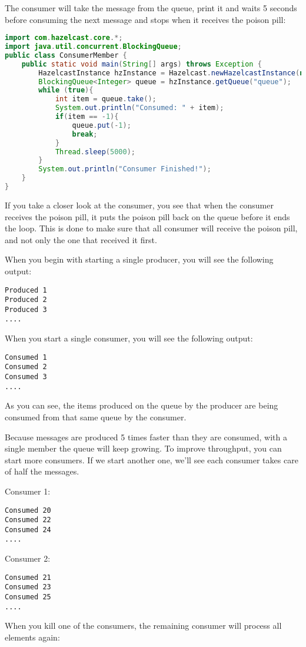 The consumer will take the message from the queue, print it and waits 5 seconds before consuming the next message and stops when it receives the poison pill:
\begin{lstlisting}[language=java]
import com.hazelcast.core.*;
import java.util.concurrent.BlockingQueue;
public class ConsumerMember {
    public static void main(String[] args) throws Exception {
        HazelcastInstance hzInstance = Hazelcast.newHazelcastInstance(null);
        BlockingQueue<Integer> queue = hzInstance.getQueue("queue");
        while (true){
            int item = queue.take();
            System.out.println("Consumed: " + item);
            if(item == -1){
                queue.put(-1);
                break;
            }     
            Thread.sleep(5000);            
        }
        System.out.println("Consumer Finished!");
    }
}
\end{lstlisting}
If you take a closer look at the consumer, you see that when the consumer receives the poison pill, it puts the poison pill back on the queue before it ends the loop. This is done to make sure that all consumer will receive the poison pill, and not only the one that received it first.

When you begin with starting a single producer, you will see the following output:
\begin{lstlisting}
Produced 1
Produced 2
Produced 3
....
\end{lstlisting}
When you start a single consumer, you will see the following output:
\begin{lstlisting}
Consumed 1
Consumed 2
Consumed 3
....
\end{lstlisting}
As you can see, the items produced on the queue by the producer are being consumed from that same queue by the consumer. 

Because messages are produced 5 times faster than they are consumed, with a single member the queue will keep growing. To improve throughput, you can start more consumers. If we start another one, we'll see each consumer takes care of half the messages.

Consumer 1:
\begin{lstlisting}
Consumed 20
Consumed 22
Consumed 24
....
\end{lstlisting}
Consumer 2:
\begin{lstlisting}
Consumed 21
Consumed 23
Consumed 25
....
\end{lstlisting}
When you kill one of the consumers, the remaining consumer will process all elements again:


